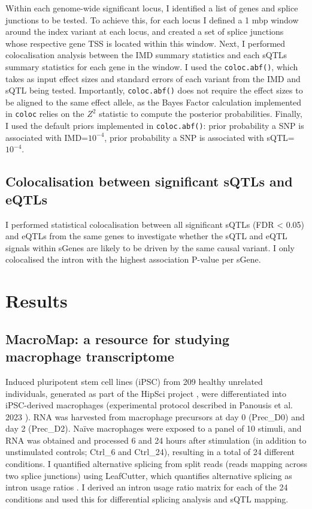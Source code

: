 Within each genome-wide significant locus, I identified a list of genes and splice junctions to be tested. To achieve this, for each locus I defined a 1 mbp window around the index variant at each locus, and created a set of splice junctions whose respective gene TSS is located within this window. Next, I performed colocalisation analysis between the IMD summary statistics and each sQTLs summary statistics for each gene in the window. I used the \Verb+coloc.abf()+, which takes as input effect sizes and standard errors of each variant from the IMD  and sQTL being tested. Importantly, \Verb+coloc.abf()+ does not require the effect sizes to be aligned to the same effect allele, as the Bayes Factor calculation implemented in \Verb+coloc+ relies on the $Z^{2}$ statistic to compute the posterior probabilities. Finally, I used the default priors implemented in \Verb+coloc.abf()+: prior probability a SNP is associated with IMD=$10^{-4}$, prior probability a SNP is associated with sQTL=$10^{-4}$.
\subsection{Colocalisation between significant sQTLs and eQTLs}
I performed statistical colocalisation between all significant sQTLs (FDR < 0.05) and eQTLs from the same genes to investigate whether the sQTL and eQTL signals within sGenes are likely to be driven by the same causal variant. I only colocalised the intron with the highest association P-value per sGene.
\newpage
\section{Results}

\subsection{MacroMap: a resource for studying macrophage transcriptome}

Induced pluripotent stem cell lines (iPSC) from 209 healthy unrelated individuals, generated as part of the HipSci project \cite{Kilpinen2017-qm}, were differentiated into iPSC-derived macrophages (experimental protocol described in Panousis et al. 2023 \cite{macromap-eqtl}). RNA was harvested from macrophage precursors at day 0 (Prec\_D0) and day 2 (Prec\_D2). \linebreak
Naïve macrophages were exposed to a panel of 10 stimuli, and RNA was obtained and processed 6 and 24 hours after stimulation (in addition to unstimulated controls; Ctrl\_6 and Ctrl\_24), resulting in a total of 24 different conditions. I quantified alternative splicing from split reads (reads mapping across two splice junctions) using LeafCutter, which quantifies alternative splicing as intron usage ratios \cite{Li2018-ll}. I derived an intron usage ratio matrix for each of the 24 conditions and used this for differential splicing analysis and sQTL mapping.\\

